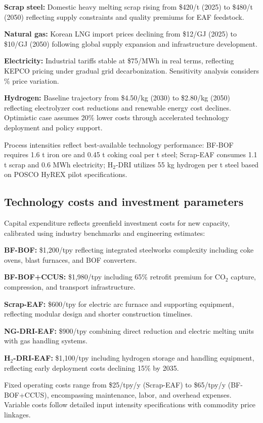 \documentclass[preprint,5p,authoryear]{elsarticle}
\begin{document}
\textbf{Scrap steel:} Domestic heavy melting scrap rising from \$420/t (2025) to \$480/t (2050) reflecting supply constraints and quality premiums for EAF feedstock.

\textbf{Natural gas:} Korean LNG import prices declining from \$12/GJ (2025) to \$10/GJ (2050) following global supply expansion and infrastructure development.

\textbf{Electricity:} Industrial tariffs stable at \$75/MWh in real terms, reflecting KEPCO pricing under gradual grid decarbonization. Sensitivity analysis considers \% price variation.

\textbf{Hydrogen:} Baseline trajectory from \$4.50/kg (2030) to \$2.80/kg (2050) reflecting electrolyzer cost reductions and renewable energy cost declines. Optimistic case assumes 20\% lower costs through accelerated technology deployment and policy support.

Process intensities reflect best-available technology performance: BF-BOF requires 1.6 t iron ore and 0.45 t coking coal per t steel; Scrap-EAF consumes 1.1 t scrap and 0.6 MWh electricity; H$_2$-DRI utilizes 55 kg hydrogen per t steel based on POSCO HyREX pilot specifications.

\subsection{Technology costs and investment parameters}

Capital expenditure reflects greenfield investment costs for new capacity, calibrated using industry benchmarks and engineering estimates:

\textbf{BF-BOF:} \$1,200/tpy reflecting integrated steelworks complexity including coke ovens, blast furnaces, and BOF converters.

\textbf{BF-BOF+CCUS:} \$1,980/tpy including 65\% retrofit premium for CO$_2$ capture, compression, and transport infrastructure.

\textbf{Scrap-EAF:} \$600/tpy for electric arc furnace and supporting equipment, reflecting modular design and shorter construction timelines.

\textbf{NG-DRI-EAF:} \$900/tpy combining direct reduction and electric melting units with gas handling systems.

\textbf{H$_2$-DRI-EAF:} \$1,100/tpy including hydrogen storage and handling equipment, reflecting early deployment costs declining 15\% by 2035.

Fixed operating costs range from \$25/tpy/y (Scrap-EAF) to \$65/tpy/y (BF-BOF+CCUS), encompassing maintenance, labor, and overhead expenses. Variable costs follow detailed input intensity specifications with commodity price linkages.
\end{document}
